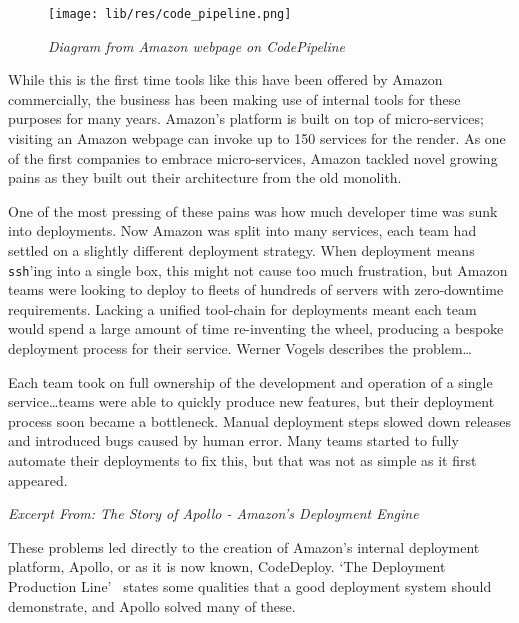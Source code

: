 \documentclass[11pt]{article}
\begin{document}
\begin{figure}
\centering
\texttt{[image: lib/res/code\_pipeline.png]}
\caption{\label{fig:scoping}\textit{Diagram from Amazon webpage on
CodePipeline}}
\end{figure}

While this is the first time tools like this have been offered by Amazon
commercially, the business has been making use of internal tools for these
purposes for many years. Amazon's platform is built on top of micro-services;
visiting an Amazon webpage can invoke up to 150 services for the render. As one
of the first companies to embrace micro-services, Amazon tackled novel growing
pains as they built out their architecture from the old monolith.

One of the most pressing of these pains was how much developer time was sunk
into deployments. Now Amazon was split into many services, each team had settled
on a slightly different deployment strategy. When deployment means
\texttt{ssh}'ing into a single box, this might not cause too much frustration,
but Amazon teams were looking to deploy to fleets of hundreds of servers with
zero-downtime requirements. Lacking a unified tool-chain for deployments meant
each team would spend a large amount of time re-inventing the wheel, producing a
bespoke deployment process for their service. Werner Vogels describes the
problem\dots

\begin{displayquote}

  Each team took on full ownership of the development and operation of a single
  service\dots teams were able to quickly produce new features, but their deployment
  process soon became a bottleneck. Manual deployment steps slowed down releases
  and introduced bugs caused by human error. Many teams started to fully
  automate their deployments to fix this, but that was not as simple as it first
  appeared.

  \textit{Excerpt From: The Story of Apollo - Amazon's Deployment
  Engine~\cite{theStoryOfApollo}}

\end{displayquote}

These problems led directly to the creation of Amazon's internal deployment
platform, Apollo, or as it is now known, CodeDeploy. `The Deployment Production
Line'~\cite{deploymentProductionLine} states some qualities that a good
deployment system should demonstrate, and Apollo solved many of these.
\end{document}
